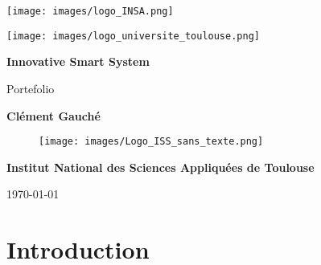\begin{titlepage}
    \centering

    \noindent %
    \begin{minipage}{0.5\textwidth}
        \texttt{[image: images/logo\_INSA.png]} %
    \end{minipage}%
    \hfill %
    \begin{minipage}{0.5\textwidth}
        \flushright %
        \texttt{[image: images/logo\_universite\_toulouse.png]} %
    \end{minipage}


    \vspace*{2cm} %
    {\Huge\bfseries Innovative Smart System \par}
    \vspace{1cm}
    {\huge Portefolio\par}
    \vspace{2cm}
    {\Large \textbf{Clément Gauché} \par}
    \vspace{2cm}
    
    \begin{figure}[H]
    \centering
    \texttt{[image: images/Logo\_ISS\_sans\_texte.png]}
    \end{figure}
    
    \vfill
    {\Large \textbf{Institut National des Sciences Appliquées de Toulouse} \par}
    \vspace{1cm}
    {\large \today \par}
\end{titlepage}

\begin{abstract}
    \lipsum[1] %
\end{abstract}

\tableofcontents

\chapter{Introduction}


